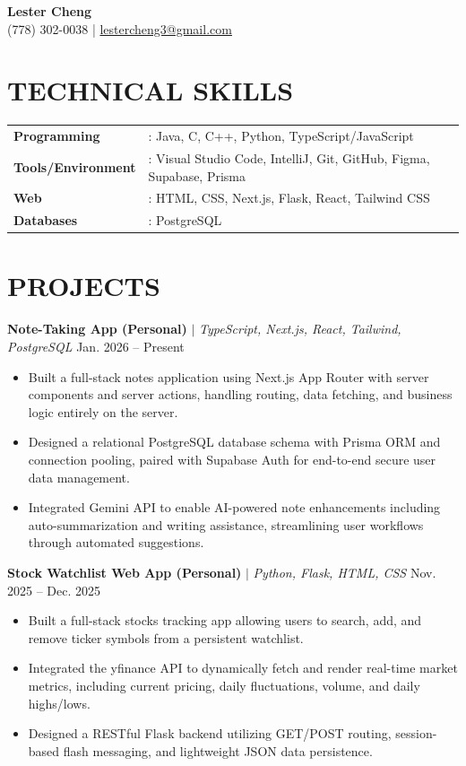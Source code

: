 \documentclass[letterpaper,11pt]{article}
\begin{document}
\begin{center}
    {\LARGE \textbf{Lester Cheng}} \\[4pt]
    (778) 302-0038 \quad | \quad \href{mailto:lestercheng3@gmail.com}{lestercheng3@gmail.com}
\end{center}

\section*{TECHNICAL SKILLS}

\begin{tabular}{@{}p{3.5cm} l}
    \textbf{Programming}      & : Java, C, C++, Python, TypeScript/JavaScript \\
    \textbf{Tools/Environment} & : Visual Studio Code, IntelliJ, Git, GitHub, Figma, Supabase, Prisma \\
    \textbf{Web}              & : HTML, CSS, Next.js, Flask, React, Tailwind CSS \\
    \textbf{Databases}        & : PostgreSQL \\
\end{tabular}

\section*{PROJECTS}

\noindent\textbf{Note-Taking App (Personal)} $|$ \textit{TypeScript, Next.js, React, Tailwind, PostgreSQL} \hfill Jan. 2026 -- Present
\begin{itemize}
    \item Built a full-stack notes application using Next.js App Router with server components and server actions, handling routing, data fetching, and business logic entirely on the server.
    \item Designed a relational PostgreSQL database schema with Prisma ORM and connection pooling, paired with Supabase Auth for end-to-end secure user data management.
    \item Integrated Gemini API to enable AI-powered note enhancements including auto-summarization and writing assistance, streamlining user workflows through automated suggestions.
\end{itemize}

\vspace{4pt}
\noindent\textbf{Stock Watchlist Web App (Personal)} $|$ \textit{Python, Flask, HTML, CSS} \hfill Nov. 2025 -- Dec. 2025
\begin{itemize}
    \item Built a full-stack stocks tracking app allowing users to search, add, and remove ticker symbols from a persistent watchlist.
    \item Integrated the yfinance API to dynamically fetch and render real-time market metrics, including current pricing, daily fluctuations, volume, and daily highs/lows.
    \item Designed a RESTful Flask backend utilizing GET/POST routing, session-based flash messaging, and lightweight JSON data persistence.
\end{itemize}
\end{document}
